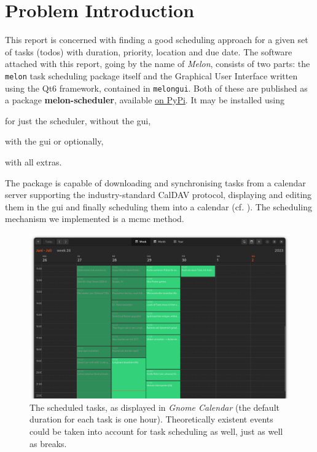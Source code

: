 \section{Problem Introduction}
\label{sec:introduction}

This report is concerned with finding a good scheduling approach for a given set of tasks (todos) with duration, priority, location and due date.
The software attached with this report, going by the name of \textit{Melon}, consists of two parts: the \texttt{melon} task scheduling package itself and the Graphical User Interface written using the Qt6 framework, contained in \texttt{melongui}.
Both of these are published as a package \textbf{melon-scheduler}, available \href{https://pypi.org/project/melon-scheduler/}{on PyPi}. It may be installed using

for just the scheduler, without the \gls{gui},

 with the \gls{gui} or optionally,

 with all extras.

The package is capable of downloading and synchronising tasks from a calendar server supporting the industry-standard CalDAV protocol, displaying and editing them in the \gls{gui} and finally scheduling them into a calendar (cf. ).
The scheduling mechanism we implemented is a \gls{mcmc} method.

\begin{figure}[H]
  \centering
  \includegraphics[width=\linewidth]{figures/exported-calendar.png}
  \caption{The scheduled tasks, as displayed in \textit{Gnome Calendar} (the default duration for each task is one hour). Theoretically existent events could be taken into account for task scheduling as well, just as well as breaks.}
  \label{fig:calendar}
\end{figure}

